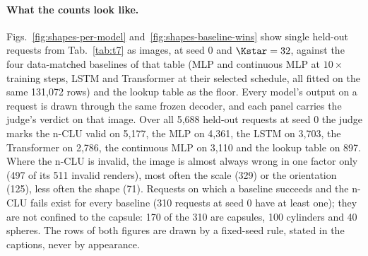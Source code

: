
\paragraph{What the counts look like.} Figs.~\ref{fig:shapes-per-model} and~\ref{fig:shapes-baseline-wins}
show single held-out requests from Tab.~\ref{tab:t7} as images, at seed 0 and $\Kstar=32$, against the
four data-matched baselines of that table (MLP and continuous MLP at $10\times$ training steps, LSTM and
Transformer at their selected schedule, all fitted on the same 131,072 rows) and the lookup table as the
floor. Every model's output on a request is drawn through the same frozen decoder, and each panel
carries the judge's verdict on that image. Over all 5,688 held-out requests at seed 0 the judge marks
the n-CLU valid on 5,177, the MLP on 4,361, the LSTM on 3,703, the Transformer on 2,786, the continuous
MLP on 3,110 and the lookup table on 897.
Where the n-CLU is invalid, the image is almost always wrong in one factor only (497 of its 511 invalid
renders), most often the scale (329) or the orientation (125), less often the shape (71).
Requests on which a baseline succeeds and the n-CLU fails exist for every baseline (310 requests at
seed 0 have at least one); they are not confined to the capsule: 170 of the 310 are capsules, 100
cylinders and 40 spheres.
The rows of both figures are drawn by a fixed-seed rule, stated in the captions, never by appearance.

